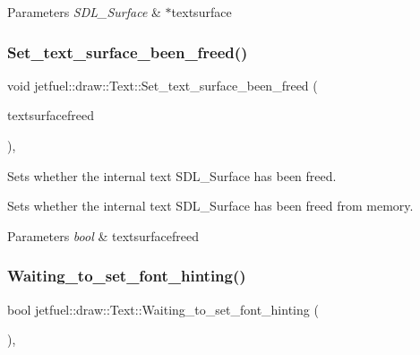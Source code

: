 \begin{DoxyParams}{Parameters}
{\em S\+D\+L\+\_\+\+Surface} & $\ast$textsurface \\
\hline
\end{DoxyParams}
\mbox{\label{classjetfuel_1_1draw_1_1Text_acc627c1cda5f466255b1899cd9477a75}} 
\subsubsection{\texorpdfstring{Set\+\_\+text\+\_\+surface\+\_\+been\+\_\+freed()}{Set\_text\_surface\_been\_freed()}}
{\footnotesize\ttfamily void jetfuel\+::draw\+::\+Text\+::\+Set\+\_\+text\+\_\+surface\+\_\+been\+\_\+freed (\begin{DoxyParamCaption}\item[{bool}]{textsurfacefreed }\end{DoxyParamCaption})\hspace{0.3cm}{\ttfamily [inline]}, {\ttfamily [protected]}}



Sets whether the internal text S\+D\+L\+\_\+\+Surface has been freed. 

Sets whether the internal text S\+D\+L\+\_\+\+Surface has been freed from memory.


\begin{DoxyParams}{Parameters}
{\em bool} & textsurfacefreed \\
\hline
\end{DoxyParams}
\mbox{\label{classjetfuel_1_1draw_1_1Text_a33158c6a5dfedf26cb0526388c347e93}} 
\subsubsection{\texorpdfstring{Waiting\+\_\+to\+\_\+set\+\_\+font\+\_\+hinting()}{Waiting\_to\_set\_font\_hinting()}}
{\footnotesize\ttfamily bool jetfuel\+::draw\+::\+Text\+::\+Waiting\+\_\+to\+\_\+set\+\_\+font\+\_\+hinting (\begin{DoxyParamCaption}{ }\end{DoxyParamCaption})\hspace{0.3cm}{\ttfamily [inline]}, {\ttfamily [protected]}}



